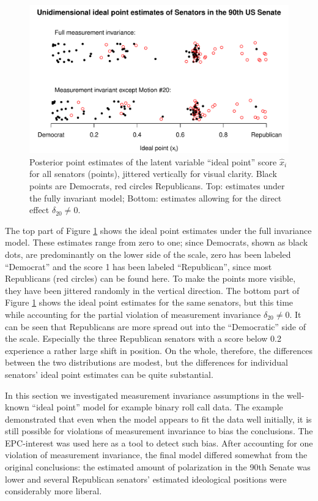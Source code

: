 \documentclass[12pt]{article}
\begin{document}
\begin{figure}\centering
\includegraphics[width=.9\textwidth]{../../outputs/ideal-points.pdf}
\caption{Posterior point estimates of the latent variable ``ideal point'' score $\hat{x}_i$ for all senators (points), jittered vertically for visual clarity. Black points are Democrats, red circles Republicans. Top: estimates under the fully invariant model; Bottom: estimates allowing for the direct effect $\delta_{20}\neq0$.}
\label{fig:ideal-points}
\end{figure}

The top part of Figure \ref{fig:ideal-points} shows the ideal point estimates under the full invariance model. These estimates range from zero to one; since Democrats, shown as black dots, are predominantly on the lower side of the scale, zero has been labeled ``Democrat'' and the score 1 has been labeled ``Republican'', since most Republicans (red circles) can be found here. To make the points more visible, they have been jittered randomly in the vertical direction. The bottom part of Figure \ref{fig:ideal-points} shows the ideal point estimates for the same senators, but this time while accounting for the partial violation of measurement invariance $\delta_{20}\neq0$. It can be seen that Republicans  are more spread out into the ``Democratic'' side of the scale. Especially the three Republican senators with a score below 0.2 experience a rather large shift in position. On the whole, therefore, the differences between the two distributions are modest, but the differences for individual senators' ideal point estimates can be quite substantial.

\bigskip
In this section we investigated measurement invariance assumptions in the well-known ``ideal point'' model for example binary roll call data. The  example  demonstrated that even when the model appears to fit the data well initially, it is still possible for violations of measurement invariance to bias the conclusions. The EPC-interest was used here as a tool to detect such bias. After accounting for one violation of measurement invariance, the final model differed somewhat from the original conclusions: the estimated amount of polarization in the 90th Senate was lower and several Republican senators' estimated ideological positions were considerably more liberal. 





\end{document}
